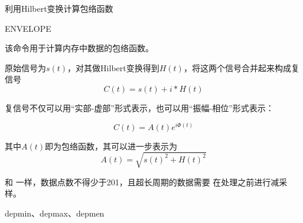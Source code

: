 \label{cmd:envelope}

利用Hilbert变换计算包络函数

\begin{SACSTX}
ENVELOPE
\end{SACSTX}

该命令用于计算内存中数据的包络函数。

原始信号为$s(t)$，对其做Hilbert变换得到$H(t)$，将这两个信号合并起来构成复信号
\[
    C(t) = s(t) + i*H(t)
\]

复信号不仅可以用``实部-虚部''形式表示，也可以用``振幅-相位''形式表示：

\[
    C(t) = A(t) e^{i\Phi(t)}
\]

其中$A(t)$即为包络函数，其可以进一步表示为
\[
    A(t) = \sqrt{s(t)^2+H(t)^2}
\]

和  一样，数据点数不得少于201，且超长周期的数据需要
在处理之前进行减采样。

depmin、depmax、depmen
